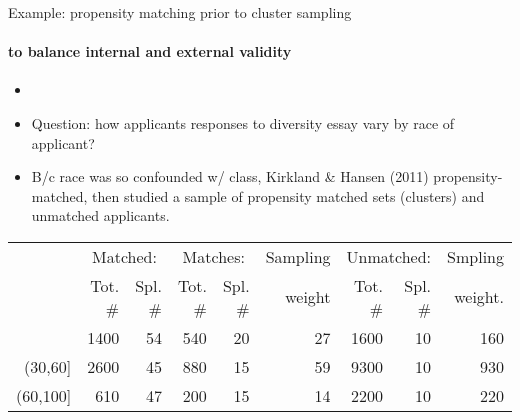 \begin{frame}{Example: propensity matching prior to cluster sampling}
  \framesubtitle{to balance internal and external validity}
  \begin{itemize}[<+->]
  \item {}
\item Question: how applicants responses to diversity essay vary by
  race of applicant?
\item B/c race was so confounded w/ class, Kirkland \& Hansen (2011)
  propensity-matched, then studied a sample of propensity matched
  sets (clusters) and unmatched applicants.
  \end{itemize}
  
  \addtolength{\tabcolsep}{-\tabcolsepadj}
  {\footnotesize
  \begin{center}
\begin{tabular}{rrrrrrrrr}
  \hline & \multicolumn{2}{c}{Matched:} & \multicolumn{2}{c}{Matches:} & \multicolumn{1}{c}{Sampling} & \multicolumn{2}{c}{Unmatched:} & \multicolumn{1}{c}{Smpling} \\ & Tot. \# & Spl. \# & Tot. \# & Spl. \# & weight & Tot. \# & Spl. \# & weight. \\ 
  \hline
[0,30] & 1400 & 54 & 540 & 20 & 27 & 1600 & 10 & 160 \\ 
  (30,60] & 2600 & 45 & 880 & 15 & 59 & 9300 & 10 & 930 \\ 
  (60,100] & 610 & 47 & 200 & 15 & 14 & 2200 & 10 & 220 \\ 
   \hline
\end{tabular}
\end{center}
}
  \addtolength{\tabcolsep}{\tabcolsepadj}
\end{frame}


